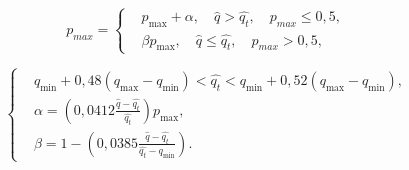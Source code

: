 \begin{equation}
\label{fared1}
p_{max} = \left\{
  \begin{aligned}
& p_{\max}+\alpha, \quad  \hat{q}>\hat{q_{t}}, \quad p_{max} \leqslant 0,5, \\
& \beta p_{\max}, \quad \hat{q}\leqslant\hat{q_{t}}, \quad p_{max} > 0,5,
  \end{aligned}
\right.
\end{equation}

\begin{equation}
\label{fared2}
\left\{
  \begin{aligned}
    & q_{\min}+0,48\left(q_{\max}-q_{\min}\right) < \hat{q_t} < q_{\min}+0,52\left(q_{\max}-q_{\min}\right), \\
    & \alpha=\left(0,0412\frac{\hat{q}-\hat{q_t}}{\hat{q_t}} \right)p_{\max}, \\ 
    & \beta=1-\left(0,0385\frac{\hat{q}-\hat{q_t}}{\hat{q_t}-q_{\min}}\right).
  \end{aligned}
\right.
\end{equation}

